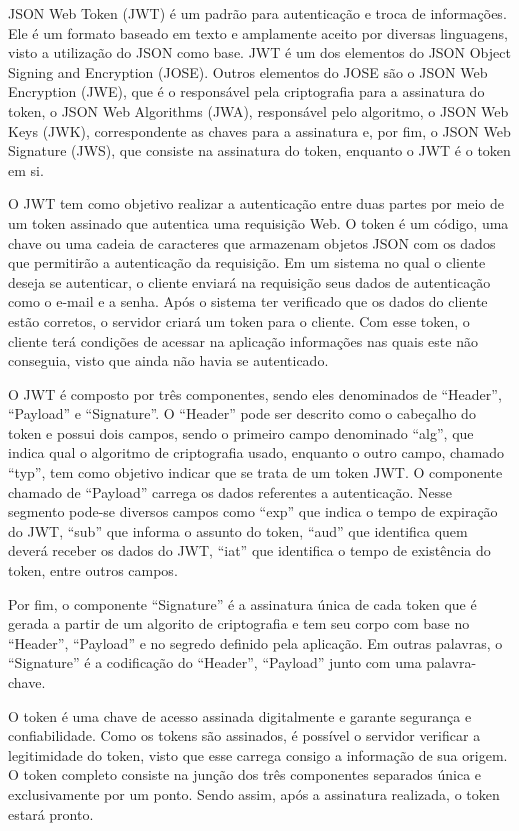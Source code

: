\documentclass[
    12pt,               %
    openright,          %
    oneside,
    a4paper,            %
    BIBLATEX,           %
    TODO,               %
    english,            %
    brazil              %
    ]{ifsp-spo-inf-ctds}
\providecommand{\DIFadd}[1]{{\protect\color{blue}\uwave{#1}}} %
\providecommand{\DIFaddbegin}{} %
\providecommand{\DIFaddend}{} %
\newcommand{\DIFaddincludegraphics}[2][]{{\color{blue}\fbox{\DIFOincludegraphics[#1]{#2}}}} %
\DeclareRobustCommand{\DIFaddbegin}{\DIFOaddbegin \let\includegraphics\DIFaddincludegraphics} %
\DeclareRobustCommand{\DIFaddend}{\DIFOaddend \let\includegraphics\DIFOincludegraphics} %
\begin{document}
            JSON Web Token (JWT) é um padrão \DIFaddbegin \DIFadd{de indústria }\DIFaddend para autenticação e troca de informações. Ele é um formato baseado em texto e amplamente aceito por diversas linguagens, visto a utilização do JSON como base. JWT é um dos elementos do JSON Object Signing and Encryption (JOSE). Outros elementos do JOSE são o JSON Web Encryption (JWE), que é o responsável pela criptografia para a assinatura do token, o JSON Web Algorithms (JWA), responsável pelo algoritmo, o JSON Web Keys (JWK), correspondente as chaves para a assinatura e, por fim, o JSON Web Signature (JWS), que consiste na assinatura do token, enquanto o JWT é o token em si.

            O JWT tem como objetivo realizar a autenticação entre duas partes por meio de um token assinado que autentica uma requisição Web. O token é um código, uma chave ou uma cadeia de caracteres que armazenam objetos JSON com os dados que permitirão a autenticação da requisição.
            Em um sistema no qual o cliente deseja se autenticar, o cliente enviará na requisição seus dados de autenticação como o e-mail e a senha. Após o sistema ter verificado que os dados do cliente estão corretos, o servidor criará um token para o cliente. Com esse token, o cliente terá condições de acessar na aplicação informações nas quais este não conseguia, visto que ainda não havia se autenticado. 

            O JWT é composto por três componentes, sendo eles denominados de “Header”, “Payload” e “Signature”. O “Header” pode ser descrito como o cabeçalho do token e possui dois campos, sendo o primeiro campo denominado “alg”, que indica qual o algoritmo de criptografia usado, enquanto o outro campo, chamado “typ”, tem como objetivo indicar que se trata de um token JWT. 
            O componente chamado de “Payload” carrega os dados referentes a autenticação. Nesse segmento pode-se diversos campos como “exp” que indica o tempo de expiração do JWT, “sub” que informa o assunto do token, “aud” que identifica quem deverá receber os dados do JWT, “iat” que identifica o tempo de existência do token, entre outros campos.

            Por fim, o componente “Signature” é a assinatura única de cada token que é gerada a partir de um algorito de criptografia e tem seu corpo com base no “Header”, “Payload” e no segredo definido pela aplicação. Em outras palavras, o “Signature” é a codificação do “Header”, “Payload” junto com uma palavra-chave.

            O token é uma chave de acesso assinada digitalmente e garante segurança e confiabilidade. Como os tokens são assinados, é possível o servidor verificar a legitimidade do token, visto que esse carrega consigo a informação de sua origem. O token completo consiste na junção dos três componentes separados única e exclusivamente por um ponto. Sendo assim, após a assinatura realizada, o token estará pronto. 
\end{document}
